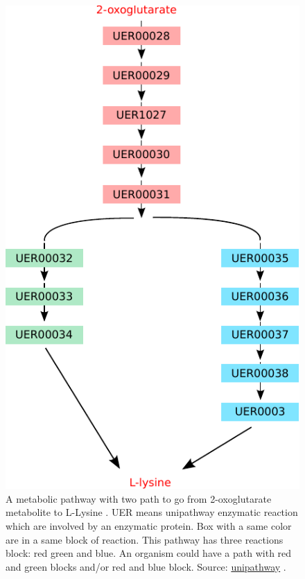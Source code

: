 \documentclass{llncs}
\begin{document}
\begin{figure}
    \centering
    \includegraphics[scale=0.6]{img/unipathway.pdf}
    \caption{A metabolic pathway with two path to go from 2-oxoglutarate metabolite to L-Lysine . UER means unipathway enzymatic reaction which are involved by an enzymatic protein. Box with a same color are in a same block of reaction. This pathway has three reactions block: red green and blue. An organism could have a path with red and green blocks and/or red and blue block. Source: \href{http://www.grenoble.prabi.fr}{unipathway} .}
    \label{fig:pathway}
\end{figure}
\end{document}
